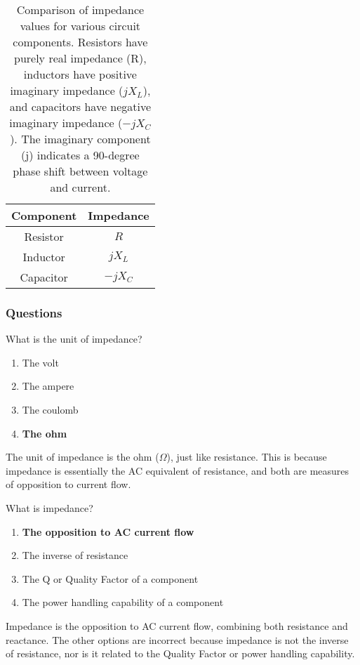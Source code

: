 \begin{table}[h]
    \centering
    \begin{tabular}{|c|c|}
        \hline
        \textbf{Component} & \textbf{Impedance} \\
        \hline
        Resistor & \( R \) \\
        Inductor & \( jX_L \) \\
        Capacitor & \( -jX_C \) \\
        \hline
    \end{tabular}
    \caption{Comparison of impedance values for various circuit components. Resistors have purely real impedance (R), inductors have positive imaginary impedance (\(jX_L\)), and capacitors have negative imaginary impedance (\(-jX_C\)). The imaginary component (j) indicates a 90-degree phase shift between voltage and current.}
    \label{tab:impedance-values}
\end{table}

\subsubsection*{Questions}
\begin{tcolorbox}[colback=gray!10!white,colframe=black!75!black,title={T5C05}]
    What is the unit of impedance?
    \begin{enumerate}[label=\Alph*),noitemsep]
        \item The volt
        \item The ampere
        \item The coulomb
        \item \textbf{The ohm}
    \end{enumerate}
\end{tcolorbox}
The unit of impedance is the ohm (\( \Omega \)), just like resistance. This is because impedance is essentially the AC equivalent of resistance, and both are measures of opposition to current flow.

\begin{tcolorbox}[colback=gray!10!white,colframe=black!75!black,title={T5C12}]
    What is impedance?
    \begin{enumerate}[label=\Alph*),noitemsep]
        \item \textbf{The opposition to AC current flow}
        \item The inverse of resistance
        \item The Q or Quality Factor of a component
        \item The power handling capability of a component
    \end{enumerate}
\end{tcolorbox}
Impedance is the opposition to AC current flow, combining both resistance and reactance. The other options are incorrect because impedance is not the inverse of resistance, nor is it related to the Quality Factor or power handling capability.

